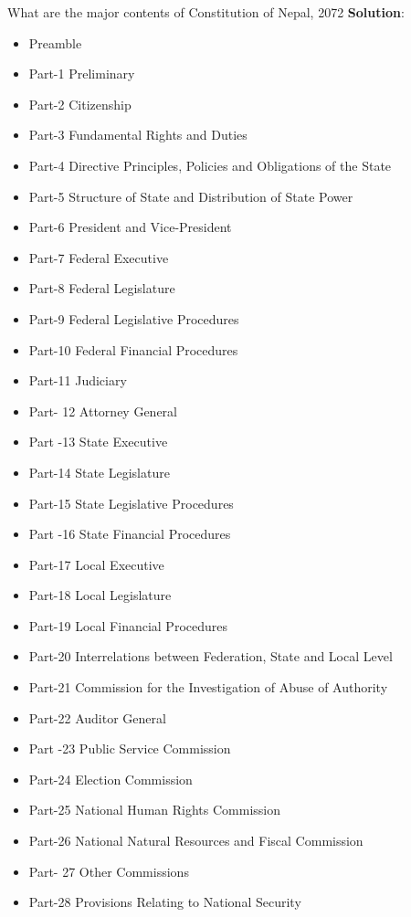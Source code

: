 \documentclass[
]{book}
\newcommand{\question}{\item}
\newenvironment{solution}{ {\bfseries Solution}:}{}
\begin{document}
\begin{questions}
\question What are the major contents of Constitution of Nepal, 2072
  \begin{solution}
  \begin{itemize}
  \item Preamble
  \item Part-1 Preliminary
  \item Part-2 Citizenship
  \item Part-3 Fundamental Rights and Duties
  \item Part-4 Directive Principles, Policies and Obligations of the State
  \item Part-5 Structure of State and Distribution of State Power
  \item Part-6 President and Vice-President
  \item Part-7 Federal Executive
  \item Part-8 Federal Legislature
  \item Part-9 Federal Legislative Procedures
  \item Part-10 Federal Financial Procedures
  \item Part-11 Judiciary
  \item Part- 12 Attorney General
  \item Part -13 State Executive
  \item Part-14 State Legislature
  \item Part-15 State Legislative Procedures
  \item Part -16 State Financial Procedures
  \item Part-17 Local Executive
  \item Part-18 Local Legislature
  \item Part-19 Local Financial Procedures
  \item Part-20 Interrelations between Federation, State and Local Level
  \item Part-21 Commission for the Investigation of Abuse of Authority
  \item Part-22 Auditor General
  \item Part -23 Public Service Commission
  \item Part-24 Election Commission
  \item Part-25 National Human Rights Commission
  \item Part-26 National Natural Resources and Fiscal Commission
  \item Part- 27 Other Commissions
  \item Part-28 Provisions Relating to National Security

\end{itemize}
\end{solution}
\end{questions}
\end{document}
